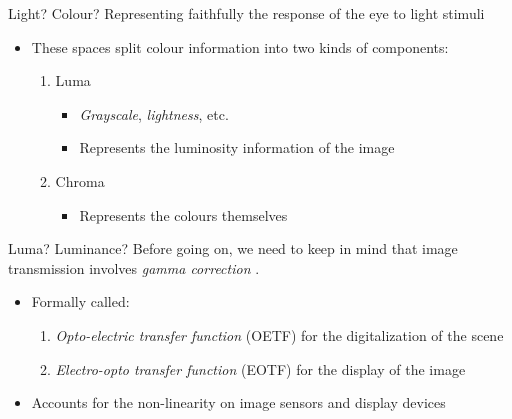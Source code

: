 \documentclass[aspectratio=169,handout,usepdftitle=false]{fireshonks}
\begin{document}
\begin{frame}{Light? Colour?}
    Representing faithfully the response of the eye to light stimuli

    \begin{itemize}
        \item These spaces split colour information into two kinds of components:
              \begin{enumerate}
                  \item Luma
                        \begin{itemize}
                            \item \emph{Grayscale}, \emph{lightness}, etc.
                            \item Represents the luminosity information of the image
                        \end{itemize}
                  \item Chroma
                        \begin{itemize}
                            \item Represents the colours themselves
                        \end{itemize}
              \end{enumerate}
    \end{itemize}
\end{frame}
\begin{frame}{Luma? Luminance?}
    Before going on, we need to keep in mind that image transmission involves \emph{gamma correction} \autocite{tooms}.
    \begin{itemize}
        \item Formally called:
              \begin{enumerate}
                  \item \emph{Opto-electric transfer function} (OETF) for the digitalization of the scene
                  \item \emph{Electro-opto transfer function} (EOTF) for the display of the image
              \end{enumerate}
        \item Accounts for the non-linearity on image sensors and display devices
    \end{itemize}
\end{frame}
\end{document}
